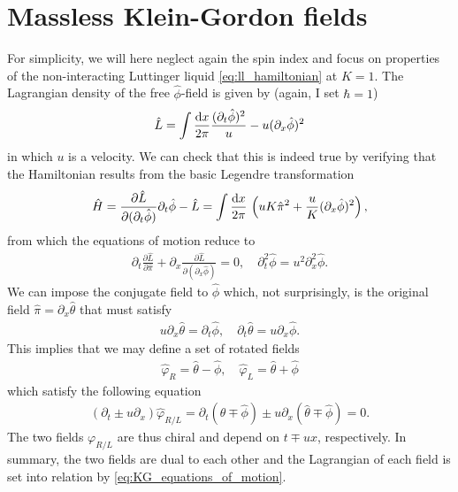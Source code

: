\section{Massless Klein-Gordon fields}
\label{sec:massless_Klein-Gordon_fields}
For simplicity, we will here neglect again the spin index and focus on properties of the non-interacting Luttinger liquid \cref{eq:ll_hamiltonian} at $K=1$.
The Lagrangian density of the free $\hat\phi$-field is given by (again, I set $\hbar=1$)
\begin{align}
    \hat L = \int\frac{\mathrm d x}{2\pi}\frac{(\partial_t\hat\phi)^2}{u}-u(\partial_x\hat\phi)^2
    \label{eq:kg_lagrangian}
\end{align}
in which $u$ is a velocity.
We can check that this is indeed true by verifying that the Hamiltonian results from the basic Legendre transformation
\begin{align}
    \hat H = \frac{\partial\hat L}{\partial(\partial_t\hat\phi)}\partial_t\hat\phi - \hat L = \int\frac{\mathrm d x}{2\pi}\, \left( uK\hat\pi^2 + \frac uK(\partial_x\hat\phi)^2 \right),
\end{align}
from which the equations of motion reduce to
\begin{align}
    \partial_t\frac{\partial\hat L}{\partial\hat\pi}+\partial_x\frac{\partial\hat L}{\partial(\partial_x\hat\phi)} = 0,
    \quad
    \partial_t^2\hat\phi  = u^2\partial_x^2\hat\phi.
    \label{eq:KG_equations_of_motion}
\end{align}
We can impose the conjugate field to $\hat\phi$ which, not surprisingly, is the original field $\hat\pi=\partial_x\hat\theta$ that must satisfy
\begin{align}
    u\partial_x\hat\theta=\partial_t\hat\phi,
    \quad
    \partial_t\hat\theta=u\partial_x\hat\phi.
\end{align}
This implies that we may define a set of rotated fields
\begin{align}
    \hat\varphi_R = \hat\theta-\hat\phi,
    \quad
    \hat\varphi_L = \hat\theta+\hat\phi
\end{align}
which satisfy the following equation
\begin{align}
    (\partial_t \pm u\partial_x)\hat\varphi_{R/L}
    =
    \partial_t(\hat\theta \mp \hat\phi) \pm u\partial_x(\hat\theta \mp \hat\phi)
    =
    0.
\end{align}
The two fields $\varphi_{R/L}$ are thus chiral and depend on $t\mp ux$, respectively.
In summary, the two fields are dual to each other and the Lagrangian of each field is set into relation by \cref{eq:KG_equations_of_motion}.
